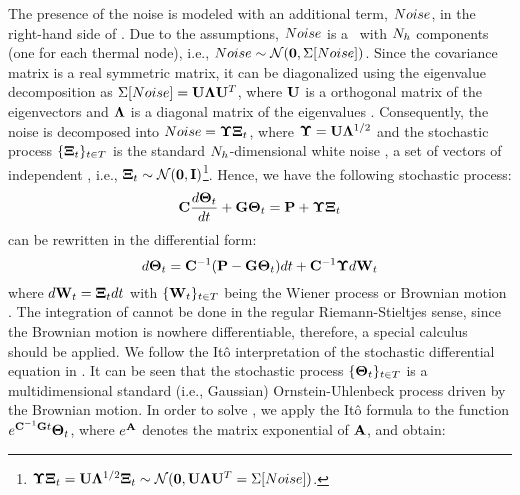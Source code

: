 The presence of the noise is modeled with an additional term, $Noise$, in the right-hand side of . Due to the assumptions, $Noise$ is a \mnrv\ with $N_h$ components (one for each thermal node), i.e., $Noise \sim \mathcal{N}(\mathbf{0}, \Sigma[Noise])$. Since the covariance matrix is a real symmetric matrix, it can be diagonalized using the eigenvalue decomposition as $\Sigma[Noise] = \mathbf{U} \mathbf{\Lambda} \mathbf{U}^T$, where $\mathbf{U}$ is a orthogonal matrix of the eigenvectors and $\mathbf{\Lambda}$ is a diagonal matrix of the eigenvalues \cite{press2007}. Consequently, the noise is decomposed into $Noise = \mathbf{\Upsilon} \mathbf{\Xi}_t$, where $\mathbf{\Upsilon} = \mathbf{U} \mathbf{\Lambda}^{1/2}$ and the stochastic process $\{ \mathbf{\Xi}_t \}_{t \in T}$ is the standard $N_h$-dimensional white noise \cite{oksendal2003}, a set of vectors of independent \snrvs, i.e., $\mathbf{\Xi}_t \sim \mathcal{N}(\mathbf{0}, \mathbf{I})$\footnote{$\mathbf{\Upsilon} \mathbf{\Xi}_t = \mathbf{U} \mathbf{\Lambda}^{1/2} \mathbf{\Xi}_t \sim \mathcal{N}(\mathbf{0}, \mathbf{U} \mathbf{\Lambda} \mathbf{U}^T = \Sigma[Noise])$.}. Hence, we have the following stochastic process:
\begin{equation} \equlabel{fourier-noise}
  \mcapacitance \frac{d\vtemperature_\time}{d\time} + \mconductance \vtemperature_\time = \vpower + \mnoisedeviation \vstdnormal_\time
\end{equation}
 can be rewritten in the differential form:
\begin{equation} \equlabel{fourier-wiener}
  d\vtemperature_\time = \mcapacitance^{-1} (\vpower - \mconductance \vtemperature_\time)d\time + \mcapacitance^{-1} \mnoisedeviation d\m{W}_\time
\end{equation}
where $d\mathbf{W}_t = \mathbf{\Xi}_t dt$ with $\{ \mathbf{W}_t \}_{t \in T}$ being the Wiener process or Brownian motion \cite{oksendal2003}. The integration of  cannot be done in the regular Riemann-Stieltjes sense, since the Brownian motion is nowhere differentiable, therefore, a special calculus should be applied. We follow the It\^{o} interpretation \cite{oksendal2003} of the stochastic differential equation in . It can be seen that the stochastic process $\{ \mathbf{\Theta}_t \}_{t \in T}$ is a multidimensional standard (i.e., Gaussian) Ornstein-Uhlenbeck process \cite{kloeden1992} driven by the Brownian motion. In order to solve , we apply the It\^{o} formula \cite{oksendal2003} to the function $e^{ \mathbf{C}^{-1} \mathbf{G} t} \mathbf{\Theta}_t$, where $e^{\mathbf{A}}$ denotes the matrix exponential of $\mathbf{A}$, and obtain:
